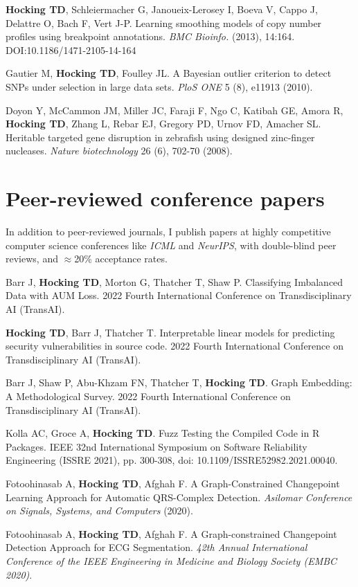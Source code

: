 \documentclass[margin,line]{res}
\begin{document}
\begin{resume}
{\bf Hocking TD}, Schleiermacher G, Janoueix-Lerosey I, Boeva V, Cappo
J, Delattre O, Bach F, Vert J-P. Learning smoothing models of copy
number profiles using breakpoint annotations. {\it BMC Bioinfo.} (2013),
14:164. DOI:10.1186/1471-2105-14-164

Gautier M, {\bf Hocking TD}, Foulley JL. A Bayesian outlier criterion
to detect SNPs under selection in large data sets. {\it PloS ONE} 5
(8), e11913 (2010).

Doyon Y, McCammon JM, Miller JC, Faraji F, Ngo C, Katibah GE, Amora R,
{\bf Hocking TD}, Zhang L, Rebar EJ, Gregory PD, Urnov FD, Amacher
SL. Heritable targeted gene disruption in zebrafish using designed
zinc-finger nucleases. {\it Nature biotechnology} 26 (6), 702-70
(2008).

\section{\sc Peer-reviewed conference papers}

In addition to peer-reviewed journals, I publish papers at highly
competitive computer science conferences like {\it ICML} and {\it
  NeurIPS}, with double-blind peer reviews, and $\approx$20\%
acceptance rates.

Barr J, {\bf Hocking TD}, Morton G, Thatcher T, Shaw P. Classifying
Imbalanced Data with AUM Loss. 2022 Fourth International Conference on
Transdisciplinary AI (TransAI). 

{\bf Hocking TD}, Barr J, Thatcher T. Interpretable linear models for predicting security vulnerabilities in source code. 2022 Fourth International Conference on Transdisciplinary AI (TransAI). 

Barr J, Shaw P, Abu-Khzam FN, Thatcher T, {\bf Hocking TD}. Graph
Embedding: A Methodological Survey. 2022 Fourth International
Conference on Transdisciplinary AI (TransAI). 

Kolla AC, Groce A, {\bf Hocking TD}. Fuzz Testing the Compiled Code in
R Packages. IEEE 32nd International Symposium on Software
Reliability Engineering (ISSRE 2021), pp. 300-308, doi:
10.1109/ISSRE52982.2021.00040.

Fotoohinasab A, {\bf Hocking TD}, Afghah F. A Graph-Constrained
Changepoint Learning Approach for Automatic QRS-Complex
Detection. {\it Asilomar Conference on Signals, Systems, and
  Computers} (2020).

Fotoohinasab A, {\bf Hocking TD}, Afghah F. A Graph-constrained
Changepoint Detection Approach for ECG Segmentation. 
{\it 42th Annual International Conference of the IEEE Engineering in
  Medicine and Biology Society (EMBC 2020)}.


\end{resume}
\end{document}
